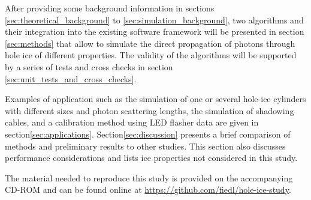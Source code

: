 After providing some background information in sections
\ref{sec:theoretical_background} to \ref{sec:simulation_background}, two
algorithms and their integration into the existing \icecube software
framework will be presented in section \ref{sec:methods} that allow to
simulate the direct propagation of photons through hole ice of different
properties. The validity of the algorithms will be supported by a series
of tests and cross checks in section
\ref{sec:unit_tests_and_cross_checks}.

Examples of application such as the simulation of one or several
hole-ice cylinders with different sizes and photon scattering lengths,
the simulation of shadowing cables, and a calibration method using LED
flasher data are given in section\nbsp\ref{sec:applications}.
Section\nbsp\ref{sec:discussion} presents a brief comparison of methods
and preliminary results to other studies. This section also discusses
performance considerations and lists ice properties not considered in
this study.

The material needed to reproduce this study is provided on the
accompanying CD-ROM and can be found online at
\url{https://github.com/fiedl/hole-ice-study}.

